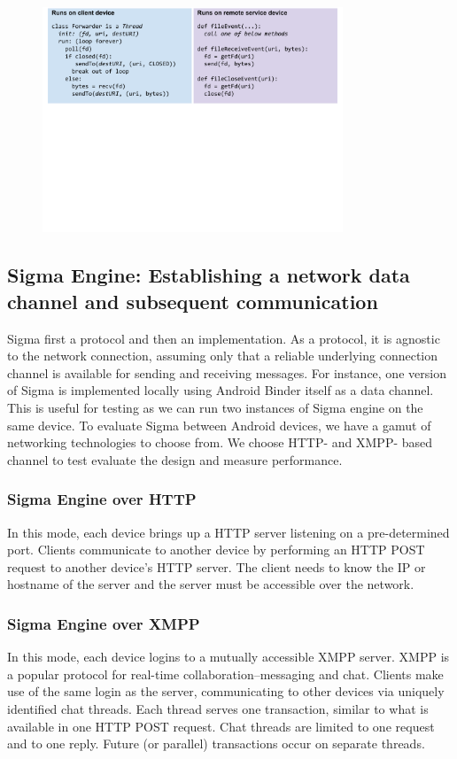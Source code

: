 \documentclass[prodmode]{acmlarge}
\begin{document}
\begin{figure}
\centering
\includegraphics[width=0.8\textwidth]{drawings/forwardFds.pdf}
\end{figure}

\subsection{Sigma Engine: Establishing a network data channel and subsequent communication}
Sigma first a protocol and then an implementation. As a protocol, it is agnostic to the network connection, assuming only that a reliable underlying connection channel is available for sending and receiving messages. For instance, one version of Sigma is implemented locally using Android Binder itself as a data channel. This is useful for testing as we can run two instances of Sigma engine on the same device. To evaluate Sigma between Android devices, we have a gamut of networking technologies to choose from. We choose HTTP- and XMPP- based channel to test evaluate the design and measure performance.

\subsubsection{Sigma Engine over HTTP}
In this mode, each device brings up a HTTP server listening on a pre-determined port. Clients communicate to another device by performing an HTTP POST request to another device's HTTP server. The client needs to know the IP or hostname of the server and the server must be accessible over the network.

\subsubsection{Sigma Engine over XMPP}
In this mode, each device logins to a mutually accessible XMPP server. XMPP is a popular protocol for real-time collaboration--messaging and chat. Clients make use of the same login as the server, communicating to other devices via uniquely identified chat threads. Each thread serves one transaction, similar to what is available in one HTTP POST request. Chat threads are limited to one request and to one reply. Future (or parallel) transactions occur on separate threads.
\end{document}
